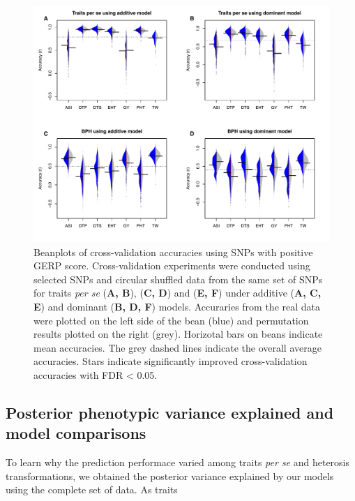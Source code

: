 \documentclass[9pt,twocolumn,twoside]{gsajnl}
\begin{document}
\begin{figure}[htbp]
\centering
\includegraphics[width=\linewidth]{Figure_gerpall.pdf}
\caption{Beanplots of cross-validation accuracies using SNPs with positive GERP score. Cross-validation experiments were conducted using selected SNPs and circular shuffled data from the same set of SNPs for traits \emph{per se} (\textbf{A, B}), \DIFdelbeginFL {}\DIFdelendFL \DIFaddbeginFL {}\DIFaddendFL (\textbf{C, D}) and \DIFdelbeginFL {}\DIFdelendFL \DIFaddbeginFL {}\DIFaddendFL (\textbf{E, F}) under additive (\textbf{A, C, E}) and dominant (\textbf{B, D, F}) models. Accuraries from the real data were plotted on the left side of the bean (blue) and permutation results plotted on the right (grey). Horizotal bars on beans indicate mean accuracies. The grey dashed lines indicate the overall average accuracies. Stars indicate significantly improved cross-validation accuracies with FDR < 0.05.}
\label{fig:gerpall}
\end{figure}


\subsection*{Posterior phenotypic variance explained and model comparisons}

To learn why the prediction performace varied among traits \emph{per se} and heterosis transformations, we obtained the posterior variance explained by our models using the complete set of data. As \DIFdelbegin {}\DIFdelend \DIFaddbegin {}\DIFaddend traits \DIFdelbegin \emph{} \DIFdelend \DIFaddbegin \emph{} 
\end{document}
